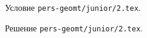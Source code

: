 \problem
Условие \texttt{pers-geomt/junior/2.tex}.

\solution Решение \texttt{pers-geomt/junior/2.tex}.
\endproblem
